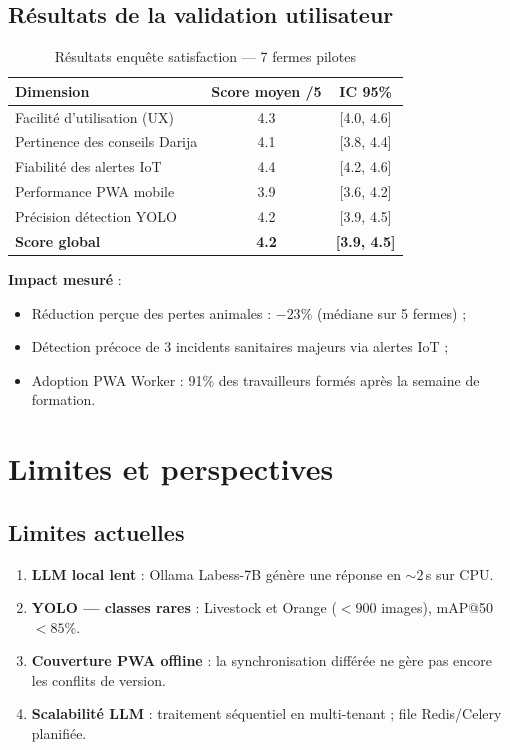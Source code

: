 \subsection{Résultats de la validation utilisateur}

\begin{table}[H]
\centering
\caption{Résultats enquête satisfaction — 7 fermes pilotes}
\label{tab:satisfaction}
\begin{tabular}{lcc}
\toprule
\textbf{Dimension} & \textbf{Score moyen /5} & \textbf{IC 95\%} \\
\midrule
Facilité d'utilisation (UX)   & 4.3 & [4.0, 4.6] \\
Pertinence des conseils Darija & 4.1 & [3.8, 4.4] \\
Fiabilité des alertes IoT     & 4.4 & [4.2, 4.6] \\
Performance PWA mobile        & 3.9 & [3.6, 4.2] \\
Précision détection YOLO      & 4.2 & [3.9, 4.5] \\
\midrule
\textbf{Score global}         & \textbf{4.2} & \textbf{[3.9, 4.5]} \\
\bottomrule
\end{tabular}
\end{table}

\textbf{Impact mesuré} :
\begin{itemize}
  \item Réduction perçue des pertes animales : $-23\%$ (médiane sur 5 fermes) ;
  \item Détection précoce de 3 incidents sanitaires majeurs via alertes IoT ;
  \item Adoption PWA Worker : 91\% des travailleurs formés après la semaine de formation.
\end{itemize}

\section{Limites et perspectives}

\subsection{Limites actuelles}

\begin{enumerate}
  \item \textbf{LLM local lent} : Ollama Labess-7B génère une réponse en $\sim 2$\,s sur CPU.
  \item \textbf{YOLO — classes rares} : Livestock et Orange ($< 900$ images), mAP@50 $< 85\%$.
  \item \textbf{Couverture PWA offline} : la synchronisation différée ne gère pas encore les conflits de version.
  \item \textbf{Scalabilité LLM} : traitement séquentiel en multi-tenant ; file Redis/Celery planifiée.
\end{enumerate}

